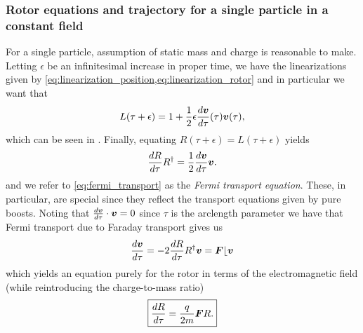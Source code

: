 \documentclass[conf]{new-aiaa}
\begin{document}
\subsubsection{Rotor equations and trajectory for a single particle in a constant field}

For a single particle, assumption of static mass and charge is reasonable to make. Letting $\epsilon$ be an infinitesimal increase in proper time, we have the linearizations given by \cref{eq:linearization_position,eq:linearization_rotor} and in particular we want that
\begin{equation}
    L(\tau+\epsilon) = 1+ \frac{1}{2}\epsilon \frac{d \boldsymbol{v}}{d\tau}(\tau) {\boldsymbol{v}}(\tau),
\end{equation}
which can be seen in \cite{doran_geometric_2003}. Finally, equating $R(\tau+\epsilon)=L(\tau+\epsilon)$ yields 
\begin{equation}
    \label{eq:fermi_transport}
    \frac{dR}{d\tau} R^\dagger = \frac{1}{2}\frac{d{\boldsymbol{v}}}{d\tau}{\boldsymbol{v}}.
\end{equation}
and we refer to \cref{eq:fermi_transport} as the \emph{Fermi transport equation}. These, in particular, are special since they reflect the transport equations given by pure boosts. Noting that $\frac{d\boldsymbol{v}}{d\tau}\cdot \boldsymbol{v}=0$ since $\tau$ is the arclength parameter we have that Fermi transport due to Faraday transport gives us
\begin{equation}
\frac{d\boldsymbol{v}}{d\tau} = -2 \frac{dR}{d \tau} R^\dagger \boldsymbol{v}=\boldsymbol{F}\lfloor \boldsymbol{v}
\end{equation}
which yields an equation purely for the rotor in terms of the electromagnetic field (while reintroducing the charge-to-mass ratio)
\begin{equation}
     \label{eq:fermi_transport_rotor}   
    \boxed{\frac{dR}{d\tau} = \frac{q}{2m} \boldsymbol{F}R.}
\end{equation}
\end{document}
